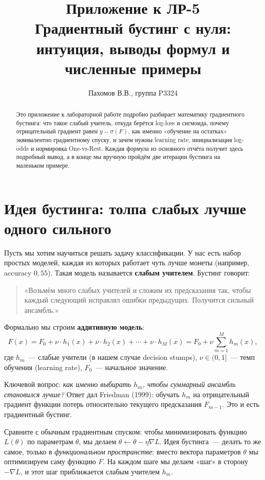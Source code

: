 \documentclass[12pt,a4paper]{article}
\title{\textbf{Приложение к ЛР-5}\\\large Градиентный бустинг с нуля:\\интуиция, выводы формул и численные примеры}
\author{Пахомов В.В., группа P3324}
\date{}
\begin{document}
\maketitle

\begin{abstract}
\noindent Это приложение к лабораторной работе подробно разбирает математику градиентного бустинга: что такое слабый учитель, откуда берётся log-loss и сигмоида, почему отрицательный градиент равен $y - \sigma(F)$, как именно «обучение на остатках» эквивалентно градиентному спуску, и зачем нужны learning rate, инициализация log-odds и нормировка One-vs-Rest. Каждая формула из основного отчёта получит здесь подробный вывод, а в конце мы вручную пройдём две итерации бустинга на маленьком примере.
\end{abstract}

\tableofcontents
\vspace{0.5cm}

\section{Идея бустинга: толпа слабых лучше одного сильного}

Пусть мы хотим научиться решать задачу классификации. У нас есть набор простых моделей, каждая из которых работает чуть лучше монеты (например, accuracy $0{,}55$). Такая модель называется \textbf{слабым учителем}. Бустинг говорит:

\begin{quote}
«Возьмём много слабых учителей и сложим их предсказания так, чтобы каждый следующий исправлял ошибки предыдущих. Получится сильный ансамбль.»
\end{quote}

Формально мы строим \textbf{аддитивную модель}:
\[
  F(x) = F_0 + \nu \cdot h_1(x) + \nu \cdot h_2(x) + \cdots + \nu \cdot h_M(x)
       = F_0 + \nu \sum_{m=1}^M h_m(x),
\]
где $h_m$~--- слабые учители (в нашем случае decision stumps), $\nu \in (0, 1]$~--- темп обучения (learning rate), $F_0$~--- начальное значение.

Ключевой вопрос: \emph{как именно выбирать $h_m$, чтобы суммарный ансамбль становился лучше?} Ответ дал Friedman (1999): обучать $h_m$ на отрицательный градиент функции потерь относительно текущего предсказания $F_{m-1}$. Это и есть градиентный бустинг.

\begin{intuition}
Сравните с обычным градиентным спуском: чтобы минимизировать функцию $L(\theta)$ по параметрам $\theta$, мы делаем $\theta \leftarrow \theta - \eta \nabla L$. Идея бустинга~--- делать то же самое, только в \emph{функциональном пространстве}: вместо вектора параметров $\theta$ мы оптимизируем саму функцию $F$. На каждом шаге мы делаем «шаг» в сторону $-\nabla L$, и этот шаг приближается слабым учителем $h_m$.
\end{intuition}
\end{document}
